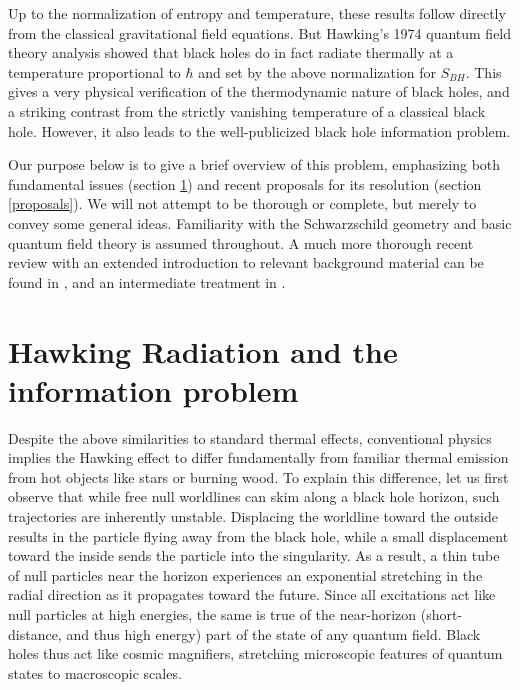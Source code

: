 \documentclass[12pt]{article}
\begin{document}
Up to the normalization of entropy and temperature, these results follow directly from the classical gravitational field equations.  But Hawking's 1974 quantum field theory analysis \cite{Hawking:1974sw} showed that black holes do in fact radiate thermally at a temperature proportional to $\hbar$ and set by the above normalization for $S_{BH}$. This gives a very physical verification of the thermodynamic nature of black holes, and a striking contrast from the strictly vanishing temperature of a classical black hole.  However, it also leads to the well-publicized black hole information problem.

Our purpose below is to give a brief overview of this problem, emphasizing both fundamental issues (section \ref{HR}) and recent proposals for its resolution (section \ref{proposals}).  We will not attempt to be thorough or complete, but merely to convey some general ideas.  Familiarity with the Schwarzschild geometry and basic quantum field theory is assumed throughout.   A much more thorough recent review with an extended introduction to relevant background material can be found in \cite{Harlow:2014yka}, and an intermediate treatment in \cite{Polchinski:2016hrw}.


\section{Hawking Radiation and the information problem}
\label{HR}

Despite the above similarities to standard thermal effects, conventional physics implies the Hawking effect to differ fundamentally from familiar thermal emission from hot objects like stars or burning wood.  To explain this difference, let us first observe that while free null worldlines can skim along a black hole horizon, such trajectories are inherently unstable.  Displacing the worldline toward the outside results in the particle flying away from the black hole, while a small displacement toward the inside sends the particle into the singularity.  As a result, a thin tube of null particles near the horizon experiences an exponential stretching in the radial direction as it propagates toward the future. Since all excitations act like null particles at high energies, the same is true of the near-horizon (short-distance, and thus high energy) part of the state of any quantum field.    Black holes thus act like cosmic magnifiers, stretching microscopic features of quantum states to macroscopic scales.
\end{document}
